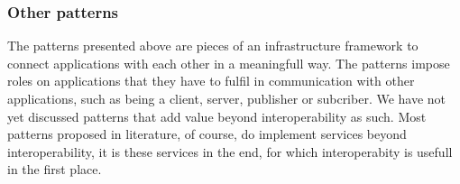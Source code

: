 \documentclass[a4paper]{scrartcl}
\newcommand{\menqAll}{\triangleleft}
\newcommand{\connect}[2]{
\draw [->,color=black] (#1) to (#2)
}
\begin{document}

\subsubsection{Other patterns}


The patterns presented above
are pieces of an infrastructure framework
to connect applications with each other
in a meaningfull way.
The patterns impose roles on applications
that they have to fulfil in communication
with other applications,
such as being a client, server, publisher or subcriber.
We have not yet discussed patterns
that add value beyond interoperability as such.
Most patterns proposed in literature, of course,
do implement services beyond interoperability,
it is these services in the end, for which interoperabity
is usefull in the first place.
\end{document}
